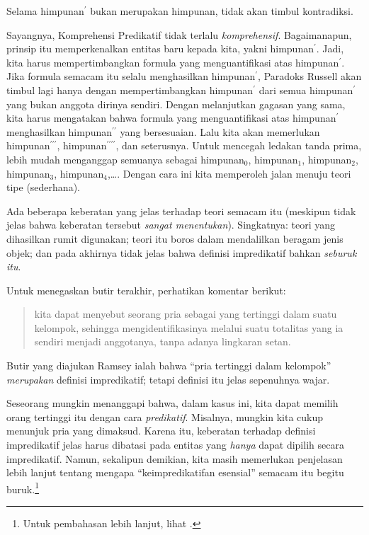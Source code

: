 \documentclass[../../../include/open-logic-section]{subfiles}
\begin{document}
Selama himpunan$^{\prime}$ bukan merupakan himpunan, tidak akan timbul
kontradiksi.

Sayangnya, Komprehensi Predikatif tidak terlalu \emph{komprehensif}. Bagaimanapun,
prinsip itu memperkenalkan entitas baru kepada kita, yakni
himpunan$^\prime$. Jadi, kita harus mempertimbangkan formula yang
menguantifikasi atas himpunan$^\prime$. Jika formula semacam itu selalu
menghasilkan himpunan$^\prime$, Paradoks Russell akan timbul lagi hanya dengan
mempertimbangkan himpunan$^\prime$ dari semua himpunan$^\prime$ yang bukan
anggota dirinya sendiri. Dengan melanjutkan gagasan yang sama, kita harus
mengatakan bahwa formula yang menguantifikasi atas himpunan$^\prime$
menghasilkan himpunan$^{\prime\prime}$ yang bersesuaian. Lalu kita akan
memerlukan himpunan$^{\prime\prime\prime}$,
himpunan$^{\prime\prime\prime\prime}$, dan seterusnya. Untuk mencegah ledakan
tanda prima, lebih mudah menganggap semuanya sebagai himpunan$_0$,
himpunan$_1$, himpunan$_2$, himpunan$_3$, himpunan$_4$,\ldots. Dengan cara
ini kita memperoleh jalan menuju teori tipe (sederhana).

Ada beberapa keberatan yang jelas terhadap teori semacam itu (meskipun tidak
jelas bahwa keberatan tersebut \emph{sangat menentukan}). Singkatnya: teori
yang dihasilkan rumit digunakan; teori itu boros dalam mendalilkan beragam
jenis objek; dan pada akhirnya tidak jelas bahwa definisi impredikatif bahkan
\emph{seburuk itu}.
	
Untuk menegaskan butir terakhir, perhatikan komentar
\citeauthor{Ramsey1925} berikut:
\begin{quote}
	kita dapat menyebut seorang pria sebagai yang tertinggi dalam suatu
	kelompok, sehingga mengidentifikasinya melalui suatu totalitas yang ia
	sendiri menjadi anggotanya, tanpa adanya lingkaran setan.
	\citep{Ramsey1925}
\end{quote}
Butir yang diajukan Ramsey ialah bahwa ``pria tertinggi dalam kelompok''
\emph{merupakan} definisi impredikatif; tetapi definisi itu jelas sepenuhnya
wajar.

Seseorang mungkin menanggapi bahwa, dalam kasus ini, kita dapat memilih orang
tertinggi itu dengan cara \emph{predikatif}. Misalnya, mungkin kita cukup
menunjuk pria yang dimaksud. Karena itu, keberatan terhadap definisi
impredikatif jelas harus dibatasi pada entitas yang \emph{hanya} dapat dipilih
secara impredikatif. Namun, sekalipun demikian, kita masih memerlukan
penjelasan lebih lanjut tentang mengapa ``keimpredikatifan esensial'' semacam
itu begitu buruk.\footnote{Untuk pembahasan lebih lanjut, lihat
\citet{Linnebo2010}.}
\end{document}

